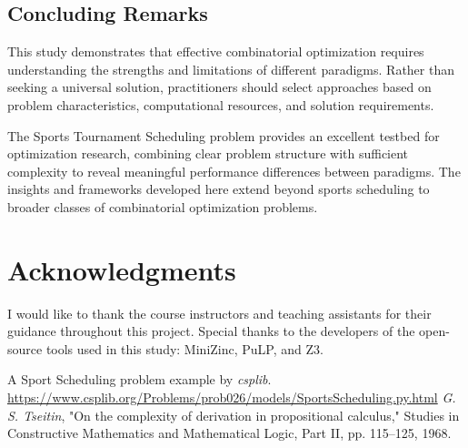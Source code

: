 \documentclass[11pt]{article}
\begin{document}
\subsection{Concluding Remarks}

This study demonstrates that effective combinatorial optimization requires understanding the strengths and limitations of different paradigms. Rather than seeking a universal solution, practitioners should select approaches based on problem characteristics, computational resources, and solution requirements.

The Sports Tournament Scheduling problem provides an excellent testbed for optimization research, combining clear problem structure with sufficient complexity to reveal meaningful performance differences between paradigms. The insights and frameworks developed here extend beyond sports scheduling to broader classes of combinatorial optimization problems.

\section*{Acknowledgments}

I would like to thank the course instructors and teaching assistants for their guidance throughout this project. Special thanks to the developers of the open-source tools used in this study: MiniZinc, PuLP, and Z3.


\begin{thebibliography}{99}

A Sport Scheduling problem example by \textit{csplib}.\\
\url{https://www.csplib.org/Problems/prob026/models/SportsScheduling.py.html}
\textit{G. S. Tseitin}, "On the complexity of derivation in propositional calculus," Studies in Constructive Mathematics and Mathematical Logic, Part II, pp. 115–125, 1968.

\end{thebibliography}
\end{document}
